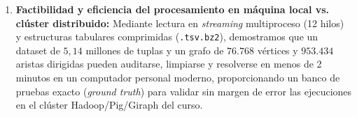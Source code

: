 \documentclass[11pt,a4paper]{article}
\begin{document}
\begin{enumerate}
    \item \textbf{Factibilidad y eficiencia del procesamiento en máquina local vs. clúster distribuido:} Mediante lectura en \textit{streaming} multiproceso (12 hilos) y estructuras tabulares comprimidas (\texttt{.tsv.bz2}), demostramos que un dataset de $5,14$ millones de tuplas y un grafo de $76.768$ vértices y $953.434$ aristas dirigidas pueden auditarse, limpiarse y resolverse en menos de 2 minutos en un computador personal moderno, proporcionando un banco de pruebas exacto (\textit{ground truth}) para validar sin margen de error las ejecuciones en el clúster Hadoop/Pig/Giraph del curso.
\end{enumerate}
\end{document}
